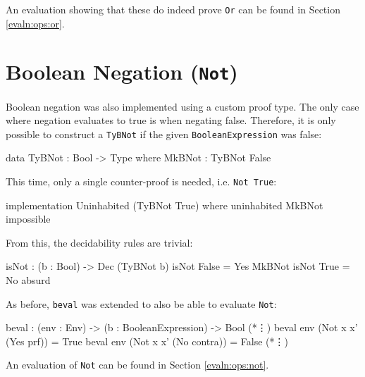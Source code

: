     An evaluation showing that these do indeed prove \texttt{Or} can be found in Section \ref{evaln:ops:or}.

\section{Boolean Negation (\texttt{Not})}
    Boolean negation was also implemented using a custom proof type. The only case where negation evaluates to true is when negating false. Therefore, it is only possible to construct a \texttt{TyBNot} if the given \texttt{BooleanExpression} was false:
    \begin{code}[caption={The proof type for \texttt{Not}}]
        data TyBNot : Bool -> Type where
            MkBNot  : TyBNot False
    \end{code}
    This time, only a single counter-proof is needed, i.e. \texttt{Not True}:
    \begin{code}[caption={Constructing \texttt{Not True} is impossible}]
        implementation Uninhabited (TyBNot True) where
            uninhabited MkBNot impossible
    \end{code}
    From this, the decidability rules are trivial:
    \begin{code}[caption={Decidability rules for \texttt{Not}}]
        isNot : (b : Bool) -> Dec (TyBNot b)
        isNot False = Yes MkBNot
        isNot True  = No absurd
    \end{code}
    As before, \texttt{beval} was extended to also be able to evaluate \texttt{Not}:
    \begin{code}[caption={\texttt{beval} for \texttt{Not}}, escapeinside={(*}{*)}]
        beval : (env : Env) -> (b : BooleanExpression) -> Bool
            (*\vdots*)
        beval env (Not x x' (Yes prf))   = True
        beval env (Not x x' (No contra)) = False
            (*\vdots*)
    \end{code}
    
    An evaluation of \texttt{Not} can be found in Section \ref{evaln:ops:not}.
    
    
